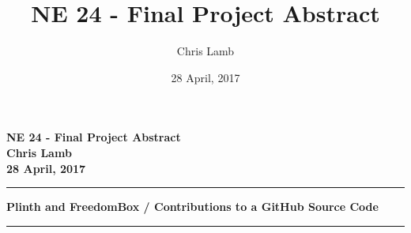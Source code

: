 \documentclass[12pt]{article}
\author{Chris Lamb}
\title{NE 24 - Final Project Abstract}
\date{28 April, 2017}
\begin{document}
\begin{center}
\textbf{NE 24 - Final Project Abstract \\ Chris Lamb \\ 28 April, 2017}
\end{center}
\noindent\rule{17cm}{1pt}

\begin{center}
\textbf{Plinth and FreedomBox / Contributions to a GitHub Source Code}
\rule{14cm}{0.4pt}
\end{center}
\end{document}
